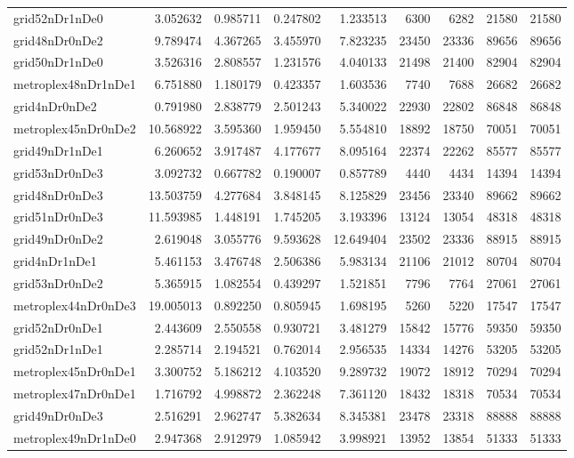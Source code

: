 \begin{longtable}{|l|r|r|r|r|r|r|r|r|}
grid52nDr1nDe0 & 3.052632 & 0.985711 & 0.247802 & 1.233513 & 6300 & 6282 & 21580 & 21580 \\
grid48nDr0nDe2 & 9.789474 & 4.367265 & 3.455970 & 7.823235 & 23450 & 23336 & 89656 & 89656 \\
grid50nDr1nDe0 & 3.526316 & 2.808557 & 1.231576 & 4.040133 & 21498 & 21400 & 82904 & 82904 \\
metroplex48nDr1nDe1 & 6.751880 & 1.180179 & 0.423357 & 1.603536 & 7740 & 7688 & 26682 & 26682 \\
grid4nDr0nDe2 & 0.791980 & 2.838779 & 2.501243 & 5.340022 & 22930 & 22802 & 86848 & 86848 \\
metroplex45nDr0nDe2 & 10.568922 & 3.595360 & 1.959450 & 5.554810 & 18892 & 18750 & 70051 & 70051 \\
grid49nDr1nDe1 & 6.260652 & 3.917487 & 4.177677 & 8.095164 & 22374 & 22262 & 85577 & 85577 \\
grid53nDr0nDe3 & 3.092732 & 0.667782 & 0.190007 & 0.857789 & 4440 & 4434 & 14394 & 14394 \\
grid48nDr0nDe3 & 13.503759 & 4.277684 & 3.848145 & 8.125829 & 23456 & 23340 & 89662 & 89662 \\
grid51nDr0nDe3 & 11.593985 & 1.448191 & 1.745205 & 3.193396 & 13124 & 13054 & 48318 & 48318 \\
grid49nDr0nDe2 & 2.619048 & 3.055776 & 9.593628 & 12.649404 & 23502 & 23336 & 88915 & 88915 \\
grid4nDr1nDe1 & 5.461153 & 3.476748 & 2.506386 & 5.983134 & 21106 & 21012 & 80704 & 80704 \\
grid53nDr0nDe2 & 5.365915 & 1.082554 & 0.439297 & 1.521851 & 7796 & 7764 & 27061 & 27061 \\
metroplex44nDr0nDe3 & 19.005013 & 0.892250 & 0.805945 & 1.698195 & 5260 & 5220 & 17547 & 17547 \\
grid52nDr0nDe1 & 2.443609 & 2.550558 & 0.930721 & 3.481279 & 15842 & 15776 & 59350 & 59350 \\
grid52nDr1nDe1 & 2.285714 & 2.194521 & 0.762014 & 2.956535 & 14334 & 14276 & 53205 & 53205 \\
metroplex45nDr0nDe1 & 3.300752 & 5.186212 & 4.103520 & 9.289732 & 19072 & 18912 & 70294 & 70294 \\
metroplex47nDr0nDe1 & 1.716792 & 4.998872 & 2.362248 & 7.361120 & 18432 & 18318 & 70534 & 70534 \\
grid49nDr0nDe3 & 2.516291 & 2.962747 & 5.382634 & 8.345381 & 23478 & 23318 & 88888 & 88888 \\
metroplex49nDr1nDe0 & 2.947368 & 2.912979 & 1.085942 & 3.998921 & 13952 & 13854 & 51333 & 51333 \\

\end{longtable}
